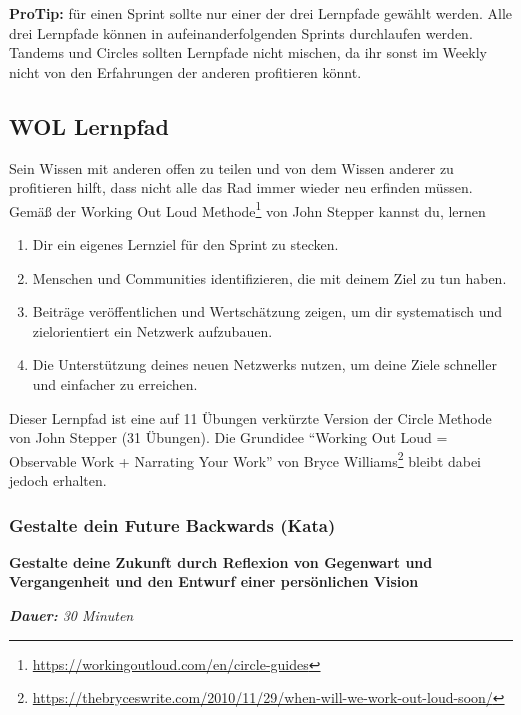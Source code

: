 \documentclass[
  ngerman,
  paper=a4,
,captions=tableheading
]{scrartcl}
\DeclareRobustCommand{\href}[2]{#2\footnote{\url{#1}}}
\providecommand{\tightlist}{%
  \setlength{\itemsep}{0pt}\setlength{\parskip}{0pt}}
\begin{document}
\textbf{ProTip:} für einen Sprint sollte nur einer der drei Lernpfade
gewählt werden. Alle drei Lernpfade können in aufeinanderfolgenden
Sprints durchlaufen werden. Tandems und Circles sollten Lernpfade nicht
mischen, da ihr sonst im Weekly nicht von den Erfahrungen der anderen
profitieren könnt.

\hypertarget{wol-lernpfad}{%
\subsection{WOL Lernpfad}\label{wol-lernpfad}}

Sein Wissen mit anderen offen zu teilen und von dem Wissen anderer zu
profitieren hilft, dass nicht alle das Rad immer wieder neu erfinden
müssen. Gemäß der
\href{https://workingoutloud.com/en/circle-guides}{Working Out Loud
Methode} von John Stepper kannst du, lernen

\begin{enumerate}
\def\labelenumi{\arabic{enumi}.}
\tightlist
\item
  Dir ein eigenes Lernziel für den Sprint zu stecken.
\item
  Menschen und Communities identifizieren, die mit deinem Ziel zu tun
  haben.
\item
  Beiträge veröffentlichen und Wertschätzung zeigen, um dir systematisch
  und zielorientiert ein Netzwerk aufzubauen.
\item
  Die Unterstützung deines neuen Netzwerks nutzen, um deine Ziele
  schneller und einfacher zu erreichen.
\end{enumerate}

Dieser Lernpfad ist eine auf 11 Übungen verkürzte Version der Circle
Methode von John Stepper (31 Übungen). Die Grundidee ``Working Out Loud
= Observable Work + Narrating Your Work''
\href{https://thebryceswrite.com/2010/11/29/when-will-we-work-out-loud-soon/}{von
Bryce Williams} bleibt dabei jedoch erhalten.

\hypertarget{gestalte-dein-future-backwards-kata}{%
\subsubsection{Gestalte dein Future Backwards
(Kata)}\label{gestalte-dein-future-backwards-kata}}

\textbf{Gestalte deine Zukunft durch Reflexion von Gegenwart und
Vergangenheit und den Entwurf einer persönlichen Vision}

\emph{\textbf{Dauer:} 30 Minuten}
\end{document}

